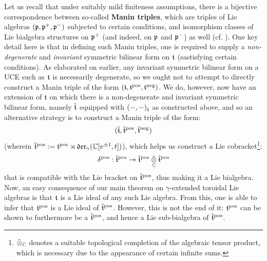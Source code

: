         Let us recall that under suitably mild finiteness assumptions, there is a bijective correspondence between so-called \textbf{Manin triples}, which are triples of Lie algebras $(\mathfrak{p}, \mathfrak{p}^+, \mathfrak{p}^-)$ subjected to certain conditions, and isomorphism classes of Lie bialgebra structures on $\mathfrak{p}^+$ (and indeed, on $\mathfrak{p}$ and $\mathfrak{p}^-$) as well (cf. \cite{etingof_kazhdan_quantisation_1}). One key detail here is that in defining such Manin triples, one is required to supply a \textit{non-degenerate} and \textit{invariant} symmetric bilinear form on $\mathfrak{t}$ (sastisfying certain conditions). As elaborated on earlier, any invariant symmetric bilinear form on a UCE such as $\mathfrak{t}$ is necessarily degenerate, so we ought not to attempt to directly construct a Manin triple of the form $(\mathfrak{t}, \mathfrak{t}^{\mathrm{pos}}, \mathfrak{t}^{\mathrm{neg}})$. We do, however, now have an extension of $\mathfrak{t}$ on which there is a non-degenerate and invariant symmetric bilinear form, namely $\hat{\mathfrak{t}}$ equipped with $(-, -)_{\hat{\mathfrak{t}}}$ as constructed above, and so an alternative strategy is to construct a Manin triple of the form:
            $$(\hat{\mathfrak{t}}, \hat{\mathfrak{t}}^{\mathrm{pos}}, \hat{\mathfrak{t}}^{\mathrm{neg}})$$
        (wherein $\hat{\mathfrak{t}}^{\mathrm{pos}} := \mathfrak{t}^{\mathrm{pos}} \rtimes \mathfrak{der}_{\gamma}(\mathbb{C}[v^{\pm 1}, t])$), which helps us construct a Lie cobracket\footnote{$\hattensor_{\bbC}$ denotes a suitable topological completion of the algebraic tensor product, which is necessary due to the appearance of certain infinite sums.}:
            $$\delta^{\positive}: \extendedtoroidal^{\positive} \to \extendedtoroidal^{\positive} \hattensor_{\bbC} \extendedtoroidal^{\positive}$$
        that is compatible with the Lie bracket on $\hat{\mathfrak{t}}^{\mathrm{pos}}$, thus making it a Lie bialgebra. Now, an easy consequence of our main theorem on $\gamma$-extended toroidal Lie algebras is that $\mathfrak{t}$ is a Lie ideal of any such Lie algebra. From this, one is able to infer that $\mathfrak{t}^{\mathrm{pos}}$ is a Lie ideal of $\hat{\mathfrak{t}}^{\mathrm{pos}}$. However, this is not the end of it: $\mathfrak{t}^{\mathrm{pos}}$ can be shown to furthermore be a  $\hat{\mathfrak{t}}^{\mathrm{pos}}$, and hence a Lie sub-bialgebra of $\hat{\mathfrak{t}}^{\mathrm{pos}}$.

